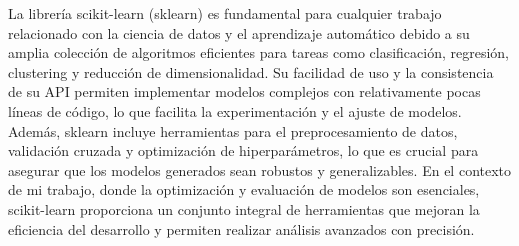 \documentclass[10pt,journal,compsoc]{IEEEtran}
\begin{document}
La librería scikit-learn (sklearn)\cite{pedregosa2011scikit} es fundamental para cualquier trabajo relacionado con la ciencia de datos y el aprendizaje automático debido a su amplia colección de algoritmos eficientes para tareas como clasificación, regresión, clustering y reducción de dimensionalidad. Su facilidad de uso y la consistencia de su API permiten implementar modelos complejos con relativamente pocas líneas de código, lo que facilita la experimentación y el ajuste de modelos. Además, sklearn incluye herramientas para el preprocesamiento de datos, validación cruzada y optimización de hiperparámetros, lo que es crucial para asegurar que los modelos generados sean robustos y generalizables. En el contexto de mi trabajo, donde la optimización y evaluación de modelos son esenciales, scikit-learn proporciona un conjunto integral de herramientas que mejoran la eficiencia del desarrollo y permiten realizar análisis avanzados con precisión.
\end{document}
